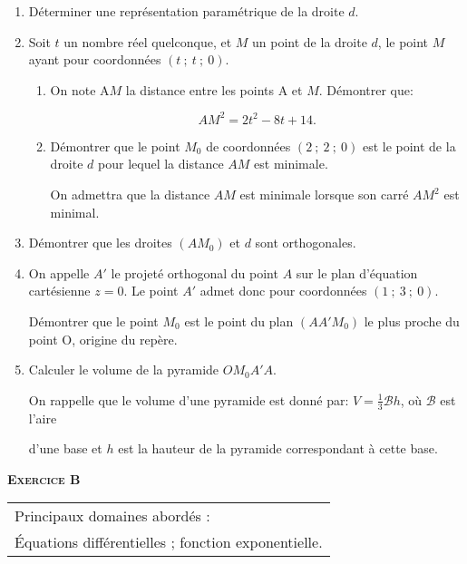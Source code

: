 \documentclass[11pt,a4paper,french]{article}
\begin{document}
 \begin{enumerate}
\item  Déterminer une représentation paramétrique de la droite $d$. 

\item Soit $t$ un nombre réel quelconque, et $M$ un point de la droite $d$, le point $M$ ayant pour coordonnées $(t~;~t~;~0)$. 
\begin{enumerate}
\item  On note A$M$ la distance entre les points A et $M$. Démontrer que: 

\[AM^2 = 2t^2 - 8t+ 14.\] 

\item Démontrer que le point $M_0$ de coordonnées $(2~;~2~;~0)$ est le point de la droite $d$ pour lequel la distance $AM$ est minimale. 

On admettra que la distance $AM$ est minimale lorsque son carré $AM^2$ est minimal. 
\end{enumerate}
\item Démontrer que les droites $(AM_0)$ et $d$ sont orthogonales. 

\item On appelle $A'$ le projeté orthogonal du point $A$ sur le plan d'équation cartésienne $z = 0$. Le point $A'$ admet donc pour coordonnées $(1~;~3~;~0)$. 

Démontrer que le point $M_0$ est le point du plan $(AA'M_0)$ le plus proche du point O, origine du repère. 

\item Calculer le volume de la pyramide $OM_0A'A$. 

On rappelle que le volume d'une pyramide est donné par: $V = \frac{1}{3}\mathcal{B}h$, où $\mathcal{B}$ est l'aire  

d'une base et $h$ est la hauteur de la pyramide correspondant à cette base. 
\end{enumerate}

 \vspace{0.75cm}
 
\textbf{\textsc{Exercice B}} 

\vspace{0.5cm}

\begin{tabular}[]{|l|}
\hline
Principaux domaines abordés :\\
Équations différentielles ; fonction exponentielle.\\
\hline
\end{tabular}
\end{document}
